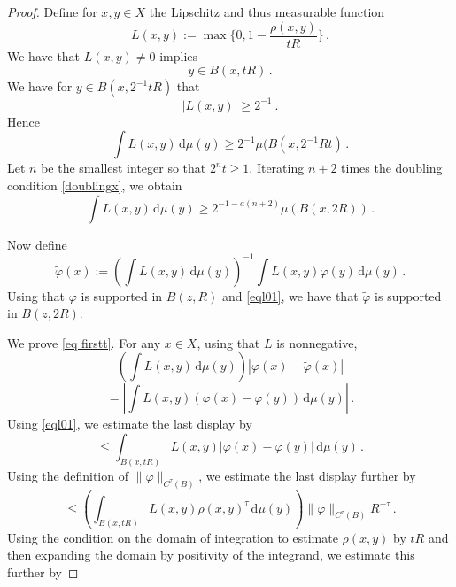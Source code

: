 \begin{proof}
    Define for $x,y\in X$ the Lipschitz  and thus measurable function
        \begin{equation}
            L(x,y) := \max\{0, 1 - \frac{\rho(x,y)}{tR}\}\, .
    \end{equation}
We  have that $L(x,y)\neq 0$ implies
\begin{equation}\label{eql01}
    y\in B(x, tR)\, .
\end{equation}
We have for $y\in B(x, 2^{-1}tR)$ that
\begin{equation}\label{eql30}
            |L(x,y)|\ge 2^{-1}  \ .
    \end{equation}
Hence
\begin{equation}
        \int L(x,y) \, \mathrm{d}\mu(y)\ge  2^{-1}\mu(B(x, 2^{-1}Rt)\, .
    \end{equation}
    Let $n$ be the smallest integer so that $2^nt\ge 1$. Iterating $n+2$ times the doubling condition \eqref{doublingx}, we obtain
        \begin{equation}\label{eql32}
        \int L(x,y) \, \mathrm{d}\mu(y)\ge  2^{-1-a(n+2)}\mu(B(x, 2R))\, .
    \end{equation}

Now define
    $$
        \tilde \varphi(x) := \left(\int L(x,y) \, \mathrm{d}\mu(y)\right)^{-1}\int L(x,y) \varphi(y) \, \mathrm{d}\mu(y)\, .
    $$
Using that $\varphi$ is supported in $B(z,R)$ and
\eqref{eql01}, we have that $\tilde{\varphi}$ is supported in $B(z,2R)$.

We prove \eqref{eq firstt}.
    For any $x\in X$, using
    that $L$ is nonnegative,
    \begin{equation}\label{eql1}
    \left(\int L(x,y) \, \mathrm{d}\mu(y)\right)
        |\varphi(x) - \tilde \varphi(x)|
    \end{equation}
    \begin{equation}\label{eql2}
    = \left| \int L(x,y)(\varphi(x) - \varphi(y)) \, \mathrm{d}\mu(y)\right|\, .
    \end{equation}
Using \eqref{eql01}, we estimate the last display by
    \begin{equation}\label{eql3}
            \le   \int_{B(x, tR)} L(x,y)|\varphi(x) - \varphi(y)| \, \mathrm{d}\mu(y)\, .\end{equation}
    Using the definition of $\|\varphi\|_{C^\tau(B)}$, we estimate the last display further by
        \begin{equation}\label{eql4}
            \le   \left(\int_{B(x, tR)} L(x,y)
            \rho(x,y)^\tau \, \mathrm{d}\mu(y) \right)\|\varphi\|_{C^\tau(B)}R^{-\tau}\, .
    \end{equation}
    Using the condition on the domain of integration to estimate $\rho(x,y)$ by $tR$ and then expanding the domain by positivity of the integrand, we estimate this further by


\end{proof}
